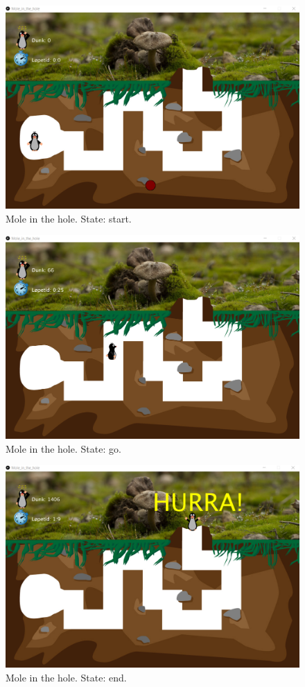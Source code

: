 \begin{figure}[h]  %
  \centering
  \includegraphics[width=.5\textwidth]{figures/StateStart-Mole_in_the_hole.png}
  \caption[Mole in the hole state start.]{Mole in the hole. State: start.}
  \label{fig:setup}
\end{figure}
\begin{figure}[h]  %
  \centering
  \includegraphics[width=.5\textwidth]{figures/StateGo-Mole_in_the_hole.png}
  \caption[Mole in the hole state go.]{Mole in the hole. State: go.}
  \label{fig:setup}
\end{figure}
\begin{figure}[h]  %
  \centering
  \includegraphics[width=.5\textwidth]{figures/EndState_Mole_in_the_hole.png}
  \caption[Mole in the hole state end.]{Mole in the hole. State: end.}
  \label{fig:setup}
\end{figure}



